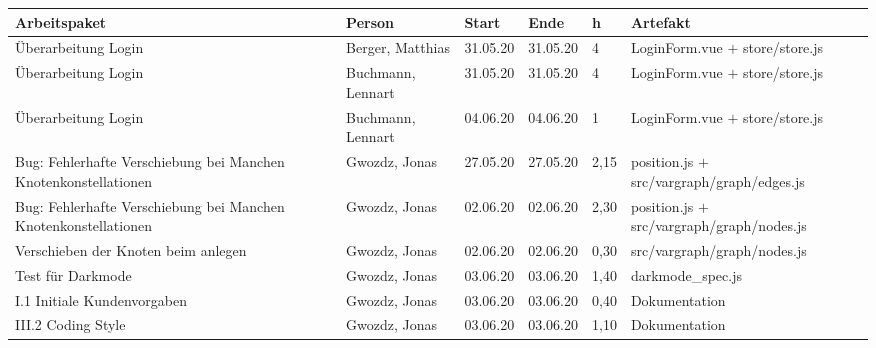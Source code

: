\begin{longtable}{|p{4cm}|p{2cm}|p{1.2cm}|p{1.2cm}|p{0.7cm}|p{6.3cm}|}
  \hline
  Arbeitspaket                                                          & Person                & Start    & Ende     & h     & Artefakt                                                    \\
  \hline
  Überarbeitung Login                                                   & Berger, Matthias      & 31.05.20 & 31.05.20 & 4     & LoginForm.vue $+$ store/store.js                                              \\ \hline
  

  Überarbeitung Login                                                   & Buchmann, Lennart     & 31.05.20 & 31.05.20 & 4     & LoginForm.vue $+$ store/store.js                                              \\ \hline
  Überarbeitung Login                                                   & Buchmann, Lennart     & 04.06.20 & 04.06.20 & 1     & LoginForm.vue $+$ store/store.js                                             \\ \hline


  Bug: Fehlerhafte Verschiebung bei Manchen Knotenkonstellationen       & Gwozdz, Jonas         & 27.05.20 & 27.05.20 & 2,15   & position.js $+$ src/vargraph/graph/edges.js                                            \\ \hline
  Bug: Fehlerhafte Verschiebung bei Manchen Knotenkonstellationen       & Gwozdz, Jonas         & 02.06.20 & 02.06.20 & 2,30   & position.js $+$ src/vargraph/graph/nodes.js                                      \\ \hline
  Verschieben der Knoten beim anlegen                                   & Gwozdz, Jonas         & 02.06.20 & 02.06.20 & 0,30   & src/vargraph/graph/nodes.js                                                \\ \hline
  Test für Darkmode                                                     & Gwozdz, Jonas         & 03.06.20 & 03.06.20 & 1,40   & darkmode\_spec.js                                               \\ \hline
  I.1 Initiale Kundenvorgaben                                           & Gwozdz, Jonas         & 03.06.20 & 03.06.20 & 0,40   & Dokumentation                                            \\ \hline
  III.2 Coding Style                                                    & Gwozdz, Jonas         & 03.06.20 & 03.06.20 & 1,10   & Dokumentation                                            \\ \hline
  

\end{longtable}
